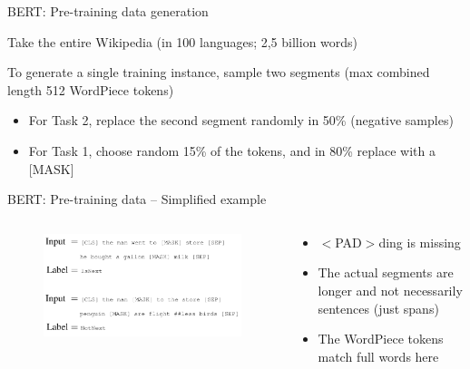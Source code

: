 \documentclass[12pt,aspectratio=169,handout]{beamer}
\begin{document}
\begin{frame}{BERT: Pre-training data generation}
	
	Take the entire Wikipedia (in 100 languages; 2,5 billion words)
	
	To generate a single training instance, sample two segments (max combined length 512 WordPiece tokens)
	
	\begin{itemize}
		\item For Task 2, replace the second segment randomly in 50\% (negative samples)
		\item For Task 1, choose random 15\% of the tokens, and in 80\% replace with a [MASK] 
	\end{itemize}
	
	
\end{frame}


\begin{frame}{BERT: Pre-training data -- Simplified example}
	
	\begin{columns}
		\begin{column}{0.9\linewidth}
			\begin{figure}
				\includegraphics[width=\linewidth]{img/bert-pretraining2.png}
			\end{figure}
		\end{column}
		\begin{column}{0.5\linewidth}
			\begin{small}
				
				\begin{itemize}
					\item $<$PAD$>$ding is missing
					\item The actual segments are longer and not necessarily sentences (just spans)
					\item The WordPiece tokens match full words here
				\end{itemize}
			\end{small}
		\end{column}
	\end{columns}
	
	
\end{frame}
\end{document}
